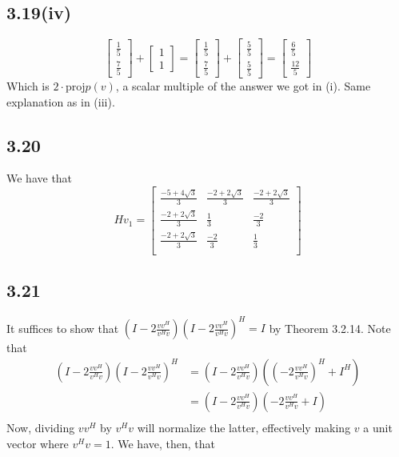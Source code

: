\documentclass[letterpaper,12pt]{article}
\theoremstyle{definition}
\begin{document}
\subsection*{3.19(iv)}

\[
\begin{bmatrix}
    \frac{1}{5}\\\frac{7}{5}
\end{bmatrix}
+
\begin{bmatrix}
    1\\1
\end{bmatrix}
=
\begin{bmatrix}
    \frac{1}{5}\\\frac{7}{5}
\end{bmatrix}
+
\begin{bmatrix}
    \frac{5}{5}\\\frac{5}{5}
\end{bmatrix}
= 
\begin{bmatrix}
    \frac{6}{5}\\\frac{12}{5}
\end{bmatrix}
\]
Which is $2\cdot \text{proj}p(v)$, a scalar multiple of the answer we got in (i). Same explanation as in (iii).

    


\subsection*{3.20}
We have that
\[Hv_1 = 
\begin{bmatrix}
     \frac{-5+4 \sqrt{3}}{3} & \frac{-2 + 2 \sqrt{3}}{3}& \frac{-2 + 2 \sqrt{3}}{3}\\
     \frac{-2 + 2 \sqrt{3}}{3} &\frac{1}{3}& \frac{-2}{3} \\
     \frac{-2 + 2 \sqrt{3}}{3} &\frac{-2}{3}& \frac{1}{3} \\
\end{bmatrix}
\]




\subsection*{3.21}
It suffices to show that $(I - 2 \frac{vv^H}{v^Hv})(I - 2 \frac{vv^H}{v^Hv})^H = I$ by Theorem 3.2.14.
Note that
\begin{align*}
(I - 2 \frac{vv^H}{v^Hv})(I - 2 \frac{vv^H}{v^Hv})^H &=(I - 2 \frac{vv^H}{v^Hv})( (- 2 \frac{vv^H}{v^Hv})^H + I^H)\\
&=(I - 2 \frac{vv^H}{v^Hv})(- 2 \frac{vv^H}{v^Hv} + I)\\
\end{align*}
Now, dividing $vv^H$ by $v^Hv$ will normalize the latter, effectively making $v$ a unit vector where $v^Hv = 1$. We have, then, that
\end{document}
